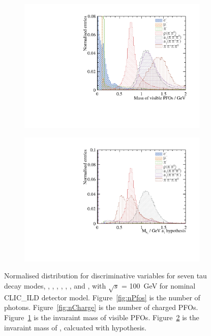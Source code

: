 \documentclass[a4paper,11pt]{article}
\newcommand{\decayElectron}{\Pem\PAGne\PGnGt}
\newcommand{\decayMuon}{\PGmm\PAGnGm\PGnGt}
\newcommand{\decayPion}{\PGpm\PGnGt}
\newcommand{\decayRho}{\PGrP{\PGpm\PGpz}\PGnGt}
\newcommand{\decayAiPhoton}{\PaDoP{\PGpm\PGpz\PGpz}\PGnGt}
\newcommand{\decayAiPion}{\PaDoP{\PGpm\PGpm\PGpp}\PGnGt}
\newcommand{\decayThreePionPhoton}{\PGpm\PGpm\PGpp\PGpz\PGnGt}
\newcommand{\decayAiPhotonShort}{\PaDoP{\PGpm\PGpz\PGpz}}
\newcommand{\rootS}{\ensuremath{\sqrt{s}} }
\begin{document}
\begin{figure}[!tbp]
\begin{subfigure}[b]{0.45\textwidth}
 \includegraphics[width=\textwidth]{plots/var/mVis_100GeV_improved_zoom}
  \caption{}
  \label{fig:mVis}
\end{subfigure}
\hfill
\begin{subfigure}[b]{0.45\textwidth}
 \includegraphics[width=\textwidth]{plots/var/mA1A1Fit_100GeV_improved_zoom}
  \caption{}
  \label{fig:mA1}
\end{subfigure}

\caption{Normalised distribution for discriminative variables for seven tau decay modes, \decayElectron, \decayMuon, \decayPion, \decayRho, \decayAiPhoton, \decayAiPion, and \decayThreePionPhoton,  with \rootS = 100 \,GeV for nominal CLIC\_ILD detector model. Figure~\ref{fig:nPfos} is the number of photons. Figure~\ref{fig:nCharge} is the number of charged PFOs. Figure~\ref{fig:mVis} is the invaraint mass of visible PFOs. Figure~\ref{fig:mA1} is the invaraint mass of \decayAiPhotonShort, calcuated with \decayAiPhotonShort hypothesis. 
}
\label{fig:var} 
\end{figure}
\end{document}
